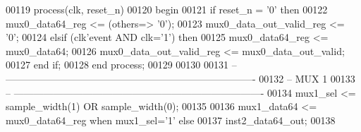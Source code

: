 \begin{DoxyCode}
00119 \textcolor{keywordflow}{process}(clk, reset_n)
00120 \textcolor{vhdlkeyword}{begin }
00121     \textcolor{keywordflow}{if} \textcolor{vhdlchar}{reset_n} \textcolor{vhdlchar}{=} \textcolor{vhdlchar}{'}\textcolor{vhdllogic}{}\textcolor{vhdllogic}{0}\textcolor{vhdlchar}{'} \textcolor{keywordflow}{then} 
00122         \textcolor{vhdlchar}{mux0_data64_reg}             \textcolor{vhdlchar}{<=} \textcolor{vhdlchar}{(}\textcolor{keywordflow}{others}\textcolor{vhdlchar}{=}\textcolor{vhdlchar}{>} \textcolor{vhdlchar}{'}\textcolor{vhdllogic}{}\textcolor{vhdllogic}{0}\textcolor{vhdlchar}{'}\textcolor{vhdlchar}{)};
00123         \textcolor{vhdlchar}{mux0_data_out_valid_reg} \textcolor{vhdlchar}{<=} \textcolor{vhdlchar}{'}\textcolor{vhdllogic}{}\textcolor{vhdllogic}{0}\textcolor{vhdlchar}{'};
00124     \textcolor{keywordflow}{elsif} \textcolor{vhdlchar}{(}\textcolor{vhdlchar}{clk}\textcolor{vhdlchar}{'}\textcolor{vhdlkeyword}{event} \textcolor{keywordflow}{AND} \textcolor{vhdlchar}{clk}\textcolor{vhdlchar}{=}\textcolor{vhdlchar}{'}\textcolor{vhdllogic}{}\textcolor{vhdllogic}{1}\textcolor{vhdlchar}{'}\textcolor{vhdlchar}{)} \textcolor{keywordflow}{then} 
00125         \textcolor{vhdlchar}{mux0_data64_reg}             \textcolor{vhdlchar}{<=} \textcolor{vhdlchar}{mux0_data64};
00126         \textcolor{vhdlchar}{mux0_data_out_valid_reg} \textcolor{vhdlchar}{<=} \textcolor{vhdlchar}{mux0_data_out_valid};
00127     \textcolor{keywordflow}{end} \textcolor{keywordflow}{if};
00128 \textcolor{keywordflow}{end} \textcolor{keywordflow}{process};
00129 
00130 
00131 \textcolor{keyword}{-- ----------------------------------------------------------------------------}
00132 \textcolor{keyword}{-- MUX 1 }
00133 \textcolor{keyword}{-- ----------------------------------------------------------------------------}
00134 \textcolor{vhdlchar}{mux1_sel}                    \textcolor{vhdlchar}{<=} \textcolor{vhdlchar}{sample_width}\textcolor{vhdlchar}{(}\textcolor{vhdllogic}{}\textcolor{vhdllogic}{1}\textcolor{vhdlchar}{)} \textcolor{keywordflow}{OR} \textcolor{vhdlchar}{sample_width}\textcolor{vhdlchar}{(}\textcolor{vhdllogic}{}\textcolor{vhdllogic}{0}\textcolor{vhdlchar}{)};
00135 
00136 \textcolor{vhdlchar}{mux1_data64}                 \textcolor{vhdlchar}{<=} \textcolor{vhdlchar}{mux0_data64_reg}          \textcolor{keywordflow}{when} \textcolor{vhdlchar}{mux1_sel}\textcolor{vhdlchar}{=}\textcolor{vhdlchar}{'}\textcolor{vhdllogic}{}\textcolor{vhdllogic}{1}\textcolor{vhdlchar}{'} \textcolor{keywordflow}{else} 
00137                                     inst2\_data64\_out;
00138                     

\end{DoxyCode}
